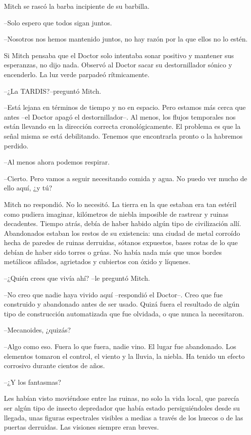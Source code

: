 {Mitch se rascó la barba incipiente de su barbilla.}

{--Solo espero que todos sigan juntos.}

{--Nosotros nos hemos mantenido juntos, no hay razón por la que ellos no
lo estén.}

{Si Mitch pensaba que el Doctor solo intentaba sonar positivo y mantener
 sus esperanzas, no dijo nada. Observó al Doctor sacar su destornillador
sónico y encenderlo. La luz verde parpadeó rítmicamente.}

{--¿La TARDIS?\@ --preguntó Mitch.}

{--Está lejana en términos de tiempo y no en espacio. Pero estamos más
 cerca que antes --el Doctor apagó el destornillador--. Al menos, los
 flujos temporales nos están llevando en la dirección correcta
 cronológicamente. El problema es que la señal misma se está debilitando.
Tenemos que encontrarla pronto o la habremos perdido.}

{--Al menos ahora podemos respirar.}

{--Cierto. Pero vamos a seguir necesitando comida y agua. No puedo ver
mucho de ello aquí, ¿y tú?}

{Mitch no respondió. No lo necesitó. La tierra en la que estaban era tan
 estéril como pudiera imaginar, kilómetros de niebla imposible de
 rastrear y ruinas decadentes. Tiempo atrás, debía de haber habido algún
 tipo de civilización allí. Abandonados estaban los restos de su
 existencia: una ciudad de metal corroído hecha de paredes de ruinas
 derruidas, sótanos expuestos, bases rotas de lo que debían de haber sido
 torres o grúas. No había nada más que unos bordes metálicos afilados,
agrietados y cubiertos con óxido y líquenes.}

{--¿Quién crees que vivía ahí? --le preguntó Mitch.}

{--No creo que nadie haya vivido aquí --respondió el Doctor--. Creo que
 fue construido y abandonado antes de ser usado. Quizá fuera el resultado
 de algún tipo de construcción automatizada que fue olvidada, o que nunca
la necesitaron.}

{--Mecanoides, ¿quizás?}

{--Algo como eso. Fuera lo que fuera, nadie vino. El lugar fue
 abandonado. Los elementos tomaron el control, el viento y la lluvia, la
niebla. Ha tenido un efecto corrosivo durante cientos de años.}

{--¿Y los fantasmas?}

{Les habían visto moviéndose entre las ruinas, no solo la vida local, que
 parecía ser algún tipo de insecto depredador que había estado
 persiguiéndoles desde su llegada, unas figuras espectrales visibles a
 medias a través de los huecos o de las puertas derruidas. Las visiones
siempre eran breves.}

